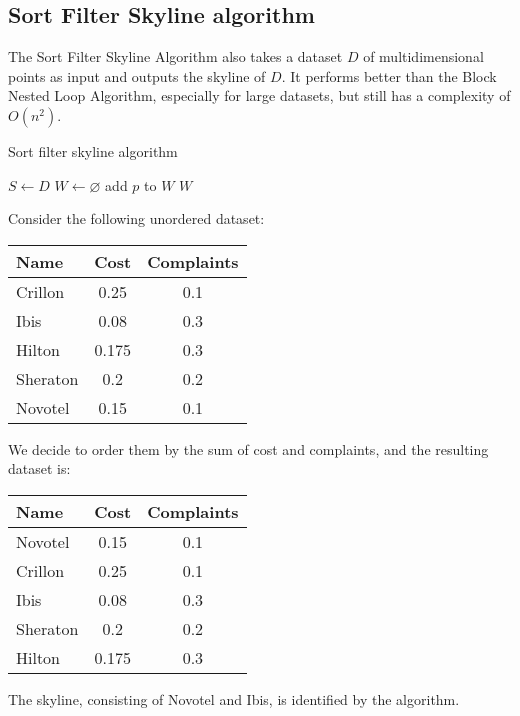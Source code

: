 \subsection{Sort Filter Skyline algorithm}
The Sort Filter Skyline Algorithm also takes a dataset $D$ of multidimensional points as input and outputs the skyline of $D$. 
It performs better than the Block Nested Loop Algorithm, especially for large datasets, but still has a complexity of $O(n^2)$.
\begin{algorithm}[H]
    \caption{Sort filter skyline algorithm}
        \begin{algorithmic}[1]
            \State $S \leftarrow D$
            \State $W \leftarrow \varnothing$
                    \State add $p$ to $W$
                \EndIf
            \EndFor
            \State \Return $W$
        \end{algorithmic}
\end{algorithm}
\begin{example}
    Consider the following unordered dataset: 
    \begin{table}[H]
        \centering
        \begin{tabular}{lcc}
        \textbf{Name}                 & \textbf{Cost} & \textbf{Complaints} \\ \hline
        \multicolumn{1}{l|}{Crillon}  & 0.25  & 0.1        \\
        \multicolumn{1}{l|}{Ibis}     & 0.08  & 0.3        \\
        \multicolumn{1}{l|}{Hilton}   & 0.175 & 0.3        \\
        \multicolumn{1}{l|}{Sheraton} & 0.2   & 0.2        \\
        \multicolumn{1}{l|}{Novotel}  & 0.15  & 0.1       
        \end{tabular}
    \end{table}
    We decide to order them by the sum of cost and complaints, and the resulting dataset is: 
    \begin{table}[H]
        \centering
        \begin{tabular}{lcc}
        \textbf{Name}                 & \textbf{Cost} & \textbf{Complaints} \\ \hline
        \multicolumn{1}{l|}{Novotel}  & 0.15          & 0.1                 \\
        \multicolumn{1}{l|}{Crillon}  & 0.25          & 0.1                 \\
        \multicolumn{1}{l|}{Ibis}     & 0.08          & 0.3                 \\
        \multicolumn{1}{l|}{Sheraton} & 0.2           & 0.2                 \\
        \multicolumn{1}{l|}{Hilton}   & 0.175         & 0.3                
        \end{tabular}
    \end{table}
    The skyline, consisting of Novotel and Ibis, is identified by the algorithm.
\end{example}


